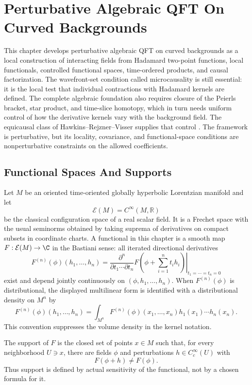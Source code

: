\chapter{Perturbative Algebraic QFT On Curved Backgrounds}
\label{ch:curved-perturbative-algebraic-qft}

\ConventionsMixed

This chapter develops perturbative algebraic QFT on curved backgrounds as a
local construction of interacting fields from Hadamard two-point functions,
local functionals, controlled functional spaces, time-ordered products, and
causal factorization.  The wavefront-set condition called microcausality is
still essential: it is the local test that individual contractions with
Hadamard kernels are defined.  The complete algebraic foundation also
requires closure of the Peierls bracket, star product, and time-slice
homotopy, which in turn needs uniform control of how the derivative kernels
vary with the background field.  The equicausal class of
Hawkins--Rejzner--Visser supplies that control
\cite{HawkinsRejznerVisser2024Equicausal}.  The framework is perturbative,
but its locality, covariance, and functional-space conditions are
nonperturbative constraints on the allowed coefficients.

\section{Functional Spaces And Supports}

Let \(M\) be an oriented time-oriented globally hyperbolic Lorentzian
manifold and let
\[
  \mathcal E(M)=C^\infty(M,\mathbb R)
\]
be the classical configuration space of a real scalar field.  It is a
Frechet space with the usual seminorms obtained by taking suprema of
derivatives on compact subsets in coordinate charts.  A functional in this
chapter is a smooth map \(F:\mathcal E(M)\to\C\) in the Bastiani sense:
all iterated directional derivatives
\[
  F^{(n)}(\phi)(h_1,\ldots,h_n)
  =
  \left.
  \frac{\partial^n}{\partial t_1\cdots\partial t_n}
  F\!\left(\phi+\sum_{i=1}^nt_i h_i\right)
  \right|_{t_1=\cdots=t_n=0}
\]
exist and depend jointly continuously on \((\phi,h_1,\ldots,h_n)\).
When \(F^{(n)}(\phi)\) is distributional, the displayed multilinear form is
identified with a distributional density on \(M^n\) by
\[
  F^{(n)}(\phi)(h_1,\ldots,h_n)
  =
  \int_{M^n}
    F^{(n)}(\phi)(x_1,\ldots,x_n)
    h_1(x_1)\cdots h_n(x_n).
\]
This convention suppresses the volume density in the kernel notation.

The support of \(F\) is the closed set of points \(x\in M\) such that, for
every neighborhood \(U\ni x\), there are fields \(\phi\) and perturbations
\(h\in C_c^\infty(U)\) with
\[
  F(\phi+h)\ne F(\phi).
\]
Thus support is defined by actual sensitivity of the functional, not by a
chosen formula for it.


